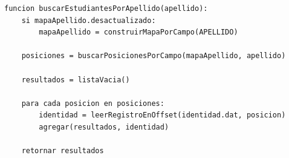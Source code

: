 \begin{lstlisting}[style=pseudocodigo]
funcion buscarEstudiantesPorApellido(apellido):
    si mapaApellido.desactualizado:
        mapaApellido = construirMapaPorCampo(APELLIDO)

    posiciones = buscarPosicionesPorCampo(mapaApellido, apellido)

    resultados = listaVacia()

    para cada posicion en posiciones:
        identidad = leerRegistroEnOffset(identidad.dat, posicion)
        agregar(resultados, identidad)

    retornar resultados
\end{lstlisting}
